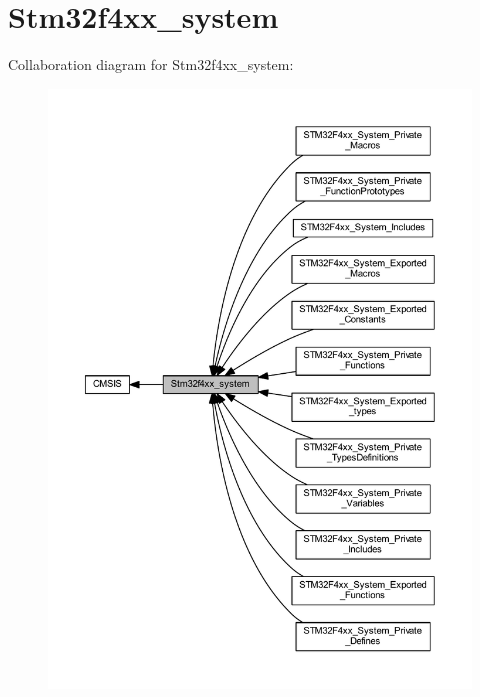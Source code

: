 \hypertarget{group__stm32f4xx__system}{}\section{Stm32f4xx\+\_\+system}
\label{group__stm32f4xx__system}
Collaboration diagram for Stm32f4xx\+\_\+system\+:
\nopagebreak
\begin{figure}[H]
\begin{center}
\leavevmode
\includegraphics[width=350pt]{group__stm32f4xx__system}
\end{center}
\end{figure}
